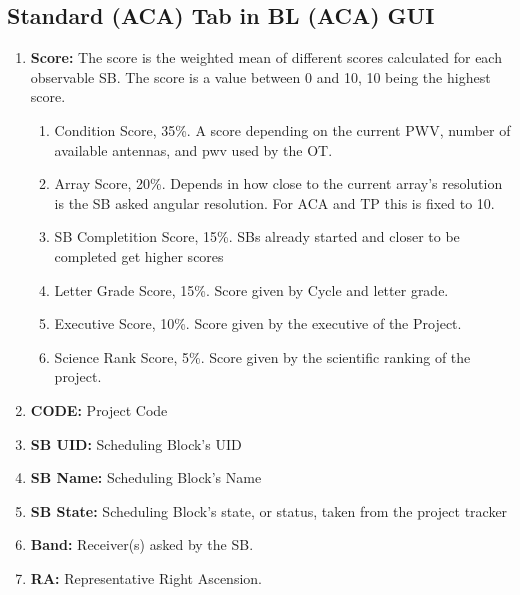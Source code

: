 \documentclass[a4paper,10pt,english]{sphinxmanual}
\begin{document}
\subsection{Standard (ACA) Tab in BL (ACA) GUI}
\label{usingwto:standard-aca-tab-in-bl-aca-gui}\begin{enumerate}
\item {} 
\textbf{Score:} The score is the weighted mean of different scores calculated
for each observable SB. The score is a value between 0 and 10,
10 being the highest score.
\begin{enumerate}
\item {} 
Condition Score, 35\%. A score depending on the current PWV, number of
available antennas, and pwv used by the OT.

\item {} 
Array Score, 20\%. Depends in how close to the current array's resolution
is the SB asked angular resolution. For ACA and TP this is fixed to 10.

\item {} 
SB Completition Score, 15\%. SBs already started and closer to be completed
get higher scores

\item {} 
Letter Grade Score, 15\%. Score given by Cycle and letter grade.

\item {} 
Executive Score, 10\%. Score given by the executive of the Project.

\item {} 
Science Rank Score, 5\%. Score given by the scientific ranking of the
project.

\end{enumerate}

\item {} 
\textbf{CODE:} Project Code

\item {} 
\textbf{SB UID:} Scheduling Block's UID

\item {} 
\textbf{SB Name:} Scheduling Block's Name

\item {} 
\textbf{SB State:} Scheduling Block's state, or status, taken from the project
tracker

\item {} 
\textbf{Band:} Receiver(s) asked by the SB.

\item {} 
\textbf{RA:} Representative Right Ascension.


\end{enumerate}
\end{document}

